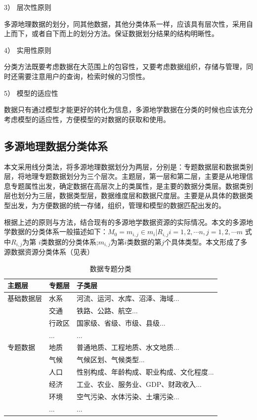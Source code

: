 \documentclass[master]{njnuthesis}
\begin{document}
3）	层次性原则

多源地理数据的划分，同其他数据，其他分类体系一样，应该具有层次性，采用自上而下，或者自下而上的划分方法。保证数据划分结果的结构明晰性。

4）	实用性原则

分类方法既要考虑数据在大范围上的包容性，又要考虑数据组织，存储与管理，同时还需要注意用户的查询，检索时候的习惯性。

5）	模型的适应性

数据只有通过模型才能更好的转化为信息，多源地学数据在分类的时候也应该充分考虑模型的适应性，方便模型的对数据的获取和使用。

\subsection{多源地理数据分类体系}
本文采用线分类法，将多源地理数据划分为两层，分别是：专题数据层和数据类别层，将地理专题数据划分为三个层次。主题层，第一层和第二层，主要是从地理信息专题属性出发，确定数据在高层次上的类属性，是主要的数据分类层。数据类别层也划分为三层，数据类型层，数据维度层和数据尺度层。主要是从具体的数据类型出发，为方便数据的统一存储，组织，管理和模型的数据匹配出发的。

根据上述的原则与方法，结合现有的多源地学数据资源的实际情况。本文的多源地学数据的分类体系一般描述如下：$M_0 = {m_{i,j} \in m_i | R _{i,j}} i = 1,2,\cdots n, j = 1,2,\cdots m$ 式中$R_{i,j}$为第 $i$类数据的分类体系;$m_{i,j}$为第$i$类数据的第$j$个具体类型。本文形成了多源数据资源分类体系（见表）

\begin{table}[t]
\caption{数据专题分类}\label{tab:table2.1}
\begin{center}
\begin{tabular}{@{}lll@{}}
\toprule
主题层   & 专题层 & 子类层                    \\ \midrule
基础数据层 & 水系  & 河流、运河、水库、沼泽、海域...      \\
      & 交通  & 铁路、公路、航空...            \\
      & 行政区 & 国家级、省级、市级、县级...        \\
      & ...    & ...                       \\
专题数据  & 地质  & 普通地质、工程地质、水文地质...      \\
      & 气候  & 气候区划、气候类型...           \\
      & 人口  & 性别构成、年龄构成、职业构成、文化程度... \\
      & 经济  & 工业、农业、服务业、GDP、财政收入...  \\
      & 环境  & 空气污染、水体污染、土壤污染...      \\
      & ...    &  ...                      \\ \bottomrule
\end{tabular}
\end{center}
\end{table}
\end{document}
